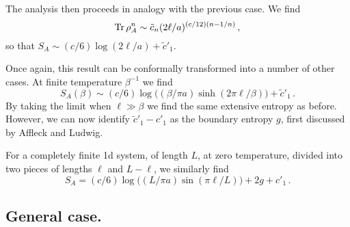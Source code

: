 \documentclass[preprint,aps]{revtex4}
\begin{document}
The analysis then proceeds in analogy with the previous case. We find
\begin{equation}
{\rm Tr}\,\rho_{A}^n\sim \tilde c_n(2\ell/a)^{(c/12)(n-1/n)}\,,
\end{equation}
so that
$S_A\sim(c/6)\log(2\ell/a)+{\tilde c}'_1$.

Once again, this result can be conformally transformed into a number of
other cases. At finite temperature $\beta^{-1}$ we find
\begin{equation}
S_A(\beta)\sim(c/6)\log\big((\beta/\pi a)\sinh(2\pi\ell/\beta)\big)+
{\tilde c}'_1\,.
\end{equation}
By taking the limit when $\ell\gg\beta$ we find the same extensive
entropy as before. However, we can now identify ${\tilde c}'_1-c'_1$
as the boundary entropy $g$, first discussed by
Affleck and Ludwig\cite{AffleckLudwig}.

For a completely finite 1d system, of length $L$, at
zero temperature, divided into two pieces of lengths $\ell$ and
$L-\ell$, we similarly find
\begin{equation}
S_A=(c/6)\log\big((L/\pi a)\sin(\pi\ell/L)\big)+2g+c'_1\,.
\end{equation}

\subsection{General case.}
\end{document}
